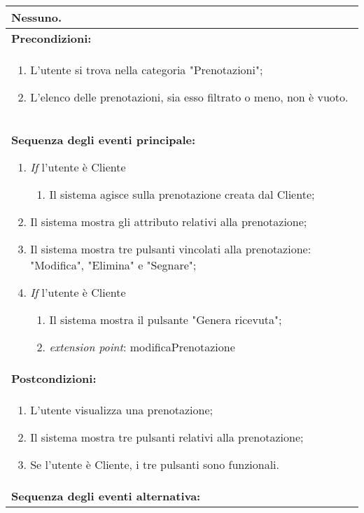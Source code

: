 \documentclass{article}
\begin{document}
\begin{table}[t]
\begin{tabular}{|p{\linewidth}|}
        Nessuno. \\
        \hline
        \cellcolor{gray!20}
        \textbf{Precondizioni:} \\
        \cellcolor{gray!20}
        \begin{minipage}{\linewidth}
            \begin{enumerate}[noitemsep]
                \item L'utente si trova nella categoria "Prenotazioni";
                \item L'elenco delle prenotazioni, sia esso filtrato o meno, non è vuoto.
            \end{enumerate}
        \end{minipage}
        \vspace{-5pt} \\
        \hline
        \textbf{Sequenza degli eventi principale:}
        \begin{enumerate}
            \item \textit{If} l'utente è Cliente
            \begin{enumerate}
                \item Il sistema agisce sulla prenotazione creata dal Cliente;
            \end{enumerate}
            \item Il sistema mostra gli attributo relativi alla prenotazione; %
            \item Il sistema mostra tre pulsanti vincolati alla prenotazione: "Modifica", "Elimina" e "Segnare";
            \item \textit{If} l'utente è Cliente
            \begin{enumerate}
                \item Il sistema mostra il pulsante "Genera ricevuta";
                \item[] \hspace*{-\tabcolsep} \textit{extension point}: modificaPrenotazione
            \end{enumerate}
        \end{enumerate} \\
        \hline
        \cellcolor{gray!20}
        \textbf{Postcondizioni:} \\
        \cellcolor{gray!20}
        \begin{minipage}{\linewidth}
            \begin{enumerate}[noitemsep]
                \item L'utente visualizza una prenotazione;
                \item Il sistema mostra tre pulsanti relativi alla prenotazione;
                \item Se l'utente è Cliente, i tre pulsanti sono funzionali.
            \end{enumerate}
        \end{minipage}
        \vspace{0pt} \\
        \hline
        \textbf{Sequenza degli eventi alternativa:}


\end{tabular}
\end{table}
\end{document}
